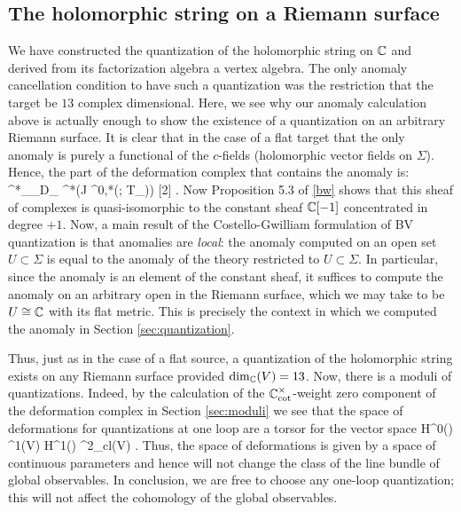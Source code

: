 
\subsection{The holomorphic string on a Riemann surface}

We have constructed the quantization of the holomorphic string on $\mathbb C$ and derived from its factorization algebra a vertex algebra. 
The only anomaly cancellation condition to have such a quantization was the restriction that the target be $13$ complex dimensional. 
Here, we see why our anomaly calculation above is actually enough to show the existence of a quantization on an arbitrary Riemann surface. 
It is clear that in the case of a flat target that the only anomaly is purely a functional of the $c$-fields (holomorphic vector fields on $\Sigma$).
Hence, the part of the deformation complex that contains the anomaly is:
\ben
\Omega^{*}_\Sigma \tensor_{D_\Sigma} \cred^*(J \Omega^{0,*}(\Sigma ; T_\Sigma)) [2] .
\een
Now Proposition 5.3 of \ref{bw} shows that this sheaf of complexes is quasi-isomorphic to the constant sheaf $\mathbb C[-1]$ concentrated in degree $+1$. 
Now, a main result of the Costello-Gwilliam formulation of BV quantization is that anomalies are {\em local}: the anomaly computed on an open set $U \subset \Sigma$ is equal to the anomaly of the theory restricted to $U \subset \Sigma$. 
In particular, since the anomaly is an element of the constant sheaf, it suffices to compute the anomaly on an arbitrary open in the Riemann surface, which we may take to be $U \cong \mathbb C$ with its flat metric. 
This is precisely the context in which we computed the anomaly in Section \ref{sec:quantization}.

Thus, just as in the case of a flat source, a quantization of the holomorphic string exists on any Riemann surface provided $\dim_{\mathbb C}(V) = 13$. 
Now, there is a moduli of quantizations.
Indeed, by the calculation of the $\mathbb C^\times_{\rm cot}$-weight zero component of the deformation complex in Section \ref{sec:moduli} we see that the space of deformations for quantizations at one loop are a torsor for the vector space
\ben
H^0(\Sigma) \tensor \Omega^1(V) \oplus H^1(\Sigma) \tensor \Omega^2_{cl}(V) .
\een 
Thus, the space of deformations is given by a space of continuous parameters and hence will not change the class of the line bundle of global observables. 
In conclusion, we are free to choose any one-loop quantization; this will not affect the cohomology of the global observables. 

